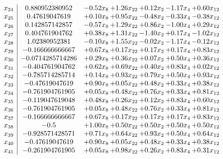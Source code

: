 \documentclass[8pt]{article}
\begin{document}
\[\begin{array}{c| c c@{\hskip 2pt} c@{\hskip 2pt} c@{\hskip 2pt} c@{\hskip 2pt} c@{\hskip 2pt} }
 x_{24}   &  0.880952380952 & -0.52 x_{8} & +  1.26 x_{22} & +  0.12 x_{2} & -1.17 x_{4} & +  0.60 x_{12}\\
 x_{25}   &  0.47619047619 & +  0.10 x_{8} & +  0.95 x_{22} & -0.48 x_{2} & -0.33 x_{4} & -0.38 x_{12}\\
 x_{26}   &  0.142857142857 & -0.57 x_{8} & +  1.29 x_{22} & +  0.86 x_{2} & -1.00 x_{4} & +  0.29 x_{12}\\
 x_{27}   &  0.404761904762 & +  0.38 x_{8} & +  1.31 x_{22} & -1.40 x_{2} & +  0.17 x_{4} & -1.02 x_{12}\\
 x_{28}   &  1.02380952381 & -0.10 x_{8} & +  1.55 x_{22} & -0.02 x_{2} & -1.17 x_{4} & -0.12 x_{12}\\
 x_{29}   &  -0.166666666667 & +  0.67 x_{8} & +  0.17 x_{22} & +  0.17 x_{2} & +  0.17 x_{4} & +  0.83 x_{12}\\
 x_{30}   &  -0.0714285714286 & +  0.29 x_{8} & +  0.36 x_{22} & +  0.07 x_{2} & +  0.50 x_{4} & +  0.36 x_{12}\\
 x_{31}   &  -0.404761904762 & +  0.62 x_{8} & +  0.69 x_{22} & +  0.40 x_{2} & +  0.83 x_{4} & +  0.02 x_{12}\\
 x_{32}   &  -0.785714285714 & +  0.14 x_{8} & +  0.93 x_{22} & +  0.79 x_{2} & +  0.50 x_{4} & +  0.93 x_{12}\\
 x_{33}   &  -0.47619047619 & +  0.90 x_{8} & +  0.05 x_{22} & +  0.48 x_{2} & +  0.33 x_{4} & +  0.38 x_{12}\\
 x_{34}   &  -0.761904761905 & +  0.05 x_{8} & +  0.48 x_{22} & +  0.76 x_{2} & +  0.33 x_{4} & +  0.81 x_{12}\\
 x_{35}   &  -0.119047619048 & +  0.48 x_{8} & +  0.26 x_{22} & +  0.12 x_{2} & +  0.83 x_{4} & +  0.60 x_{12}\\
 x_{36}   &  -0.761904761905 & +  0.05 x_{8} & +  0.48 x_{22} & +  0.76 x_{2} & +  0.33 x_{4} & +  0.81 x_{12}\\
 x_{37}   &  -0.166666666667 & +  0.67 x_{8} & +  0.17 x_{22} & +  0.17 x_{2} & +  0.17 x_{4} & +  0.83 x_{12}\\
 x_{38}   &  -0.5 & +  1.00 x_{8} & +  0.50 x_{22} & +  0.50 x_{2} & +  0.50 x_{4} & +  0.50 x_{12}\\
 x_{39}   &  -0.928571428571 & +  0.71 x_{8} & +  0.64 x_{22} & +  0.93 x_{2} & +  0.50 x_{4} & +  0.64 x_{12}\\
 x_{40}   &  -0.47619047619 & +  0.90 x_{8} & +  0.05 x_{22} & +  0.48 x_{2} & +  0.33 x_{4} & +  0.38 x_{12}\\
 x_{41}   &  -0.261904761905 & +  0.05 x_{8} & +  0.98 x_{22} & +  0.26 x_{2} & +  0.83 x_{4} & +  0.31 x_{12}\\

\end{array}\]
\end{document}
